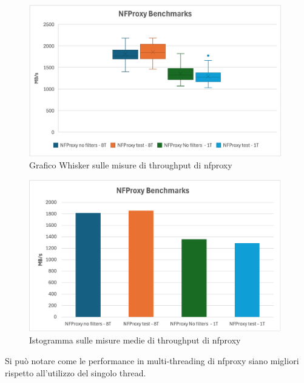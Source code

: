 \begin{figure}[H]
    \centering
    \includegraphics[width=0.98\textwidth]{images/chapter4/whisker_nfproxy.png}
    \caption{Grafico Whisker sulle misure di throughput di nfproxy}\label{fig:wisker_nfproxy}
\end{figure}

\begin{figure}[H]
    \centering
    \includegraphics[width=0.98\textwidth]{images/chapter4/istogramma_nfproxy.png}
    \caption{Istogramma sulle misure medie di throughput di nfproxy}\label{fig:istogramma_nfproxy}
\end{figure}

Si può notare come le performance in multi-threading di nfproxy siano migliori rispetto all'utilizzo del singolo thread.

